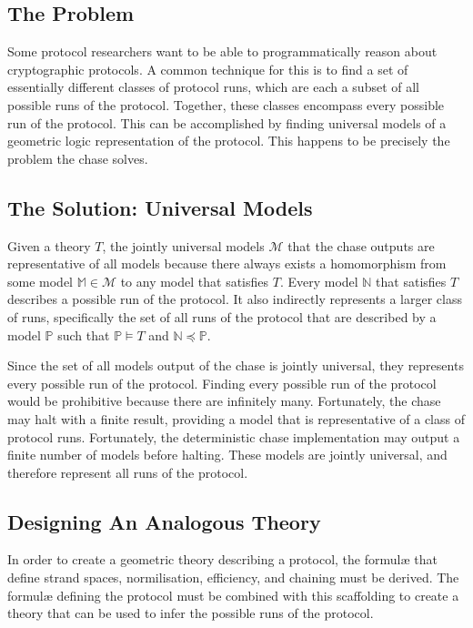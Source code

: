 	\subsection{The Problem}

		Some protocol researchers want to be able to programmatically reason
		about cryptographic protocols. A common technique for this is to find a
		set of essentially different classes of protocol runs, which are each a
		subset of all possible runs of the protocol. Together, these classes
		encompass every possible run of the protocol. This can be accomplished
		by finding universal models of a geometric logic representation of the
		protocol. This happens to be precisely the problem the chase solves.

	\subsection{The Solution: Universal Models}

		Given a theory $T$, the jointly universal models $\mathcal{M}$ that the
		chase outputs are representative of all models because there always
		exists a homomorphism from some model $\mathbb{M} \in \mathcal{M}$ to
		any model that satisfies $T$. Every model $\mathbb{N}$ that satisfies
		$T$ describes a possible run of the protocol. It also indirectly
		represents a larger class of runs, specifically the set of all runs of
		the protocol that are described by a model $\mathbb{P}$ such that
		$\mathbb{P} \models T$ and $\mathbb{N} \preceq \mathbb{P}$.

		Since the set of all models output of the chase is jointly universal,
		they represents every possible run of the protocol. Finding every
		possible run of the protocol would be prohibitive because there are
		infinitely many. Fortunately, the chase may halt with a finite result,
		providing a model that is representative of a class of protocol runs.
		Fortunately, the deterministic chase implementation may output a finite
		number of models before halting. These models are jointly universal, and
		therefore represent all runs of the protocol.

	\subsection{Designing An Analogous Theory}

		In order to create a geometric theory describing a protocol, the
		formul{\ae} that define strand spaces, normilisation, efficiency, and
		chaining must be derived. The formul{\ae} defining the protocol must be
		combined with this scaffolding to create a theory that can be used to
		infer the possible runs of the protocol.

